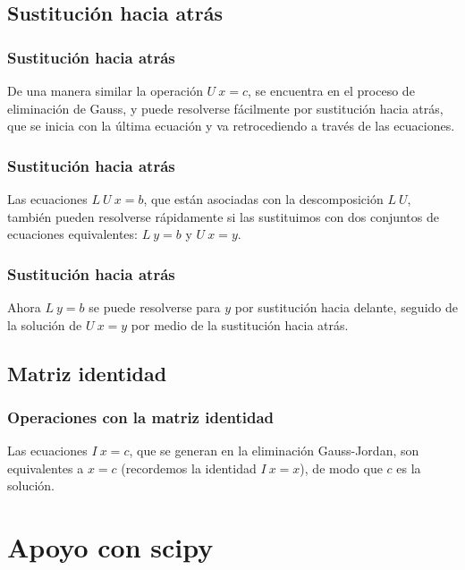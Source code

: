 \subsection*{Sustitución hacia atrás}
\begin{frame}
\frametitle{Sustitución hacia atrás}
De una manera similar la operación $U \: x = c$, se encuentra en el proceso de eliminación de Gauss, y puede resolverse fácilmente por sustitución hacia atrás, que se inicia con la última ecuación y va retrocediendo a través de las ecuaciones.
\end{frame}
\begin{frame}
\frametitle{Sustitución hacia atrás}
Las ecuaciones $L \: U \: x = b$, que están asociadas con la descomposición $L \: U$, también pueden resolverse rápidamente si las sustituimos con dos conjuntos de ecuaciones equivalentes: $L \: y = b$ y $U \: x = y$.
\end{frame}
\begin{frame}
\frametitle{Sustitución hacia atrás}
Ahora $L \: y = b$ se puede resolverse para $y$ por sustitución hacia delante, seguido de la solución de $U \: x = y$ por medio de la sustitución hacia atrás.
\end{frame}
\subsection*{Matriz identidad}
\begin{frame}
\frametitle{Operaciones con la matriz identidad}
Las ecuaciones $I \: x = c$, que se generan en la eliminación Gauss-Jordan, son equivalentes a $x = c$ (recordemos la identidad $I \: x = x$), de modo que $c$ es la solución.
\end{frame}
\section{Apoyo con scipy}
